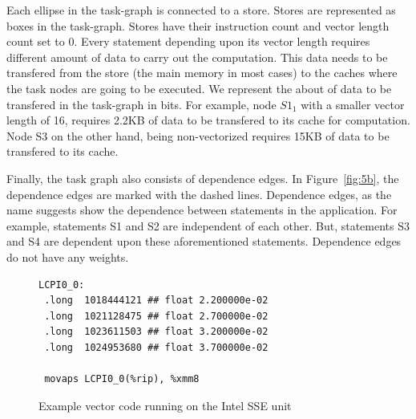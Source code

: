 Each ellipse in the task-graph is connected to a store. Stores are
represented as boxes in the task-graph. Stores have their instruction
count and vector length count set to 0. Every statement depending upon
its vector length requires different amount of data to carry out the
computation. This data needs to be transfered from the store (the main
memory in most cases) to the caches where the task nodes are going to be
executed. We represent the about of data to be transfered in the
task-graph in bits. For example, node $S1_1$ with a smaller vector
length of 16, requires 2.2KB of data to be transfered to its cache for
computation. Node S3 on the other hand, being non-vectorized requires
15KB of data to be transfered to its cache.

Finally, the task graph also consists of dependence edges. In
Figure~\ref{fig:5b}, the dependence edges are marked with the dashed
lines. Dependence edges, as the name suggests show the dependence
between statements in the application. For example, statements S1 and S2
are independent of each other. But, statements S3 and S4 are dependent
upon these aforementioned statements. Dependence edges do not have any
weights.

\begin{figure}[h!]
  \centering
\begin{verbatim}
LCPI0_0:
 .long	1018444121 ## float 2.200000e-02
 .long	1021128475 ## float 2.700000e-02
 .long	1023611503 ## float 3.200000e-02
 .long	1024953680 ## float 3.700000e-02

 movaps	LCPI0_0(%rip), %xmm8
\end{verbatim}
  \caption{Example vector code running on the Intel SSE unit}
  \label{fig:6}
\end{figure}




